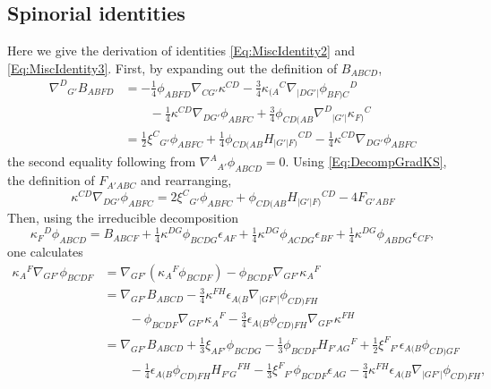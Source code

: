 \documentclass[10pt,a4paper]{article}
\theoremstyle{plain}
\begin{document}
\subsection{Spinorial identities}

Here we give the derivation of identities \eqref{Eq:MiscIdentity2} and
\eqref{Eq:MiscIdentity3}. First, by expanding out the definition of
$B_{ABCD}$,
\begin{align*}
\nabla^D{}_{G'}B_{ABFD} &= - \tfrac{1}{4} \phi_{ABFD}
\nabla_{CG'}\kappa^{CD} - \tfrac{3}{4} \kappa_{(A}{}^{C} \nabla_{\vert
  DG'\vert}\phi_{BF)C}{}^{D} \\ &\qquad - \tfrac{1}{4} \kappa^{CD}
\nabla_{DG'}\phi_{ABFC} + \tfrac{3}{4} \phi_{CD(AB}
\nabla^{D}{}_{\vert G'\vert}\kappa_{F)}{}^{C} \\ &=\tfrac{1}{2}
\xi^{C}{}_{G'} \phi_{ABFC} + \tfrac{1}{4} \phi_{CD(AB} H_{\vert
  G'\vert F)}{}^{CD} - \tfrac{1}{4} \kappa^{CD}
\nabla_{DG'}\phi_{ABFC}
\end{align*}
the second equality following from
$\nabla^A{}_{A'}\phi_{ABCD}=0$. Using \eqref{Eq:DecompGradKS}, the
definition of $F_{A'ABC}$ and rearranging,
\begin{equation}
 \kappa^{CD} \nabla_{DG'}\phi_{ABFC} = 2 \xi^{C}{}_{G'} \phi_{ABFC} +
 \phi_{CD(AB} H_{\vert G'\vert F)}{}^{CD} - 4
 F_{G'ABF}\label{Eq:MiscIdentity}
 \end{equation}
Then, using the irreducible decomposition
\begin{equation*}
\kappa_{F}{}^{D} \phi_{ABCD} = B_{ABCF} + \tfrac{1}{4} \kappa^{DG}
\phi_{BCDG} \epsilon_{AF} + \tfrac{1}{4} \kappa^{DG} \phi_{ACDG}
\epsilon_{BF} + \tfrac{1}{4} \kappa^{DG} \phi_{ABDG} \epsilon_{CF},
\end{equation*}
one calculates
\begin{align*}
	\kappa_{A}{}^{F} \nabla_{GF'}\phi_{BCDF} &=
        \nabla_{GF'}(\kappa_{A}{}^{F}\phi_{BCDF}) -
        \phi_{BCDF}\nabla_{GF'}\kappa_{A}{}^{F}\\ &=
        \nabla_{GF'}B_{ABCD} - \tfrac{3}{4} \kappa^{FH} \epsilon_{A(B}
        \nabla_{\vert GF'\vert}\phi_{CD)FH}\\ &\qquad - \phi_{BCDF}
        \nabla_{GF'}\kappa_{A}{}^{F} - \tfrac{3}{4}
        \epsilon_{A(B}\phi_{CD)FH}
        \nabla_{GF'}\kappa^{FH}\\ &=\nabla_{GF'}B_{ABCD} +
        \tfrac{1}{3} \xi_{AF'} \phi_{BCDG} - \tfrac{1}{3} \phi_{BCDF}
        H_{F'AG}{}^{F} + \tfrac{1}{2} \xi^{F}{}_{F'}\epsilon_{A(B}
        \phi_{CD)GF} \\ &\qquad - \tfrac{1}{4}
        \epsilon_{A(B}\phi_{CD)FH} H_{F'G}{}^{FH} - \tfrac{1}{3}
        \xi^{F}{}_{F'} \phi_{BCDF} \epsilon_{AG} - \tfrac{3}{4}
        \kappa^{FH} \epsilon_{A(B} \nabla_{\vert
          GF'\vert}\phi_{CD)FH},
\end{align*}
\end{document}
